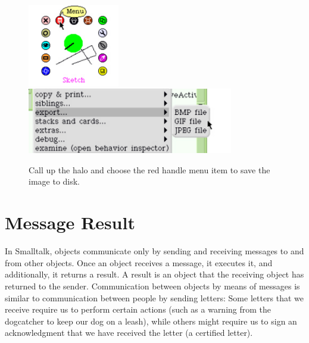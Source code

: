 \documentclass[a4paper,10pt,twoside]{book}
\begin{document}
\begin{figure}
\begin{center}
\includegraphics[width=4cm]{sketchWithHalo}\includegraphics[width=9cm]{sketchExportMenu}
\caption{Call up the halo and choose the red handle menu item  to save the image to disk. } \label{sketchWithHalo}
\end{center}
\end{figure}



\section{Message Result}
In Smalltalk, objects communicate only by sending and receiving messages to and from other 
objects. Once an object receives a message, it executes it, and additionally, it returns a result. A 
result is an object that the receiving object has returned to the sender. Communication between 
objects by means of messages is similar to communication between people by sending letters: 
Some letters that we receive require us to perform certain actions (such as a warning from the 
dogcatcher to keep our dog on a leash), while others might require us to sign an acknowledgment 
that we have received the letter (a certified letter). 
\end{document}
